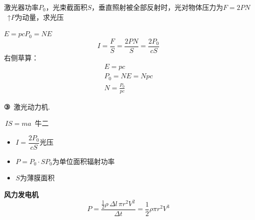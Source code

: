 \begin{problem}[{②}]
激光器功率$P_0$，光束截面积$S$，垂直照射被全部反射时，光对物体压力为$F=2PN$\ ↑\quad $P$为动量，求光压 %
\begin{solution}
$E=pc$\qquad $P_0=NE$ %
\[
I=\frac FS=\frac{2PN}{S}=\frac{2P_0}{cS}
\]
右侧草算：
\begin{gather*}
E=pc\\
P_0=NE=Npc\\
\boxed{N=\frac{P_0}{pc}} %
\end{gather*}
\red{$\checkmark$} %
\end{solution}
\end{problem}
\textbf{③}\ 激光动力机.

\,$IS=ma$\ 牛二
\begin{itemize}
\item $I=\dfrac{2P_0}{cS}$\quad 光压 %
\item $P=P_0\cdot S$\quad $P_0$为单位面积辐射功率
\item $S$为薄膜面积
\end{itemize}
\textbf{风力发电机}
\[
P=\frac{\frac12\rho\,\Delta l\,\pi r^2V^2}{\Delta t}=\frac12\rho\pi r^2V^3 %
\]
